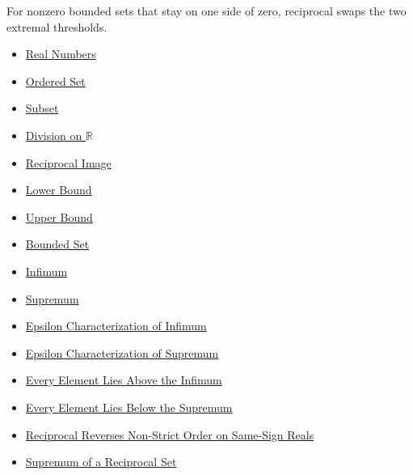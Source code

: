 \begin{remark*}[Interpretation]
For nonzero bounded sets that stay on one side of zero, reciprocal swaps the
two extremal thresholds.
\end{remark*}

\begin{dependencies}
\begin{itemize}
  \item \hyperref[def:reals]{Real Numbers}
  \item \hyperref[def:ordered-set]{Ordered Set}
  \item \hyperref[def:subset]{Subset}
  \item \hyperref[def:division-on-r]{Division on $\mathbb{R}$}
  \item \hyperref[def:reciprocal-image]{Reciprocal Image}
  \item \hyperref[def:real-lower-bound]{Lower Bound}
  \item \hyperref[def:real-upper-bound]{Upper Bound}
  \item \hyperref[def:bounded]{Bounded Set}
  \item \hyperref[def:infimum]{Infimum}
  \item \hyperref[def:supremum]{Supremum}
  \item \hyperref[def:epsilon-characterization-of-infimum]{Epsilon Characterization of Infimum}
  \item \hyperref[def:epsilon-characterization-of-supremum]{Epsilon Characterization of Supremum}
  \item \hyperref[prop:every-element-lies-above-the-infimum]{Every Element Lies Above the Infimum}
  \item \hyperref[prop:every-element-lies-below-the-supremum]{Every Element Lies Below the Supremum}
  \item \hyperref[thm:reciprocal-reverses-nonstrict-order-on-same-sign-r]{Reciprocal Reverses Non-Strict Order on Same-Sign Reals}
  \item \hyperref[thm:supremum-reciprocal-set]{Supremum of a Reciprocal Set}
\end{itemize}
\end{dependencies}

